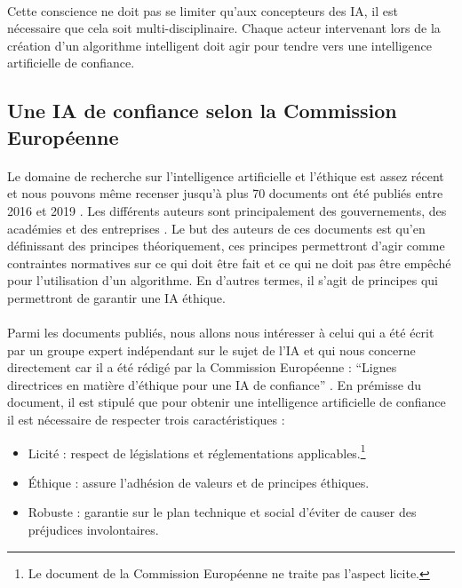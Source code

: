 \documentclass[10pt, french, a4paper]{report}
\begin{document}
\paragraph{}
Cette conscience ne doit pas se limiter qu’aux concepteurs des IA, il est nécessaire que cela soit multi-disciplinaire. Chaque acteur intervenant lors de la création d'un algorithme intelligent doit agir pour tendre vers une intelligence artificielle de confiance.

\subsection{Une IA de confiance selon la Commission Européenne}
\label{subsec:ia_confiance_com_ue}

\paragraph{}
Le domaine de recherche sur l'intelligence artificielle et l'éthique est assez récent et nous pouvons même recenser jusqu'à plus 70 documents ont été publiés entre 2016 et 2019 \citep{algorithm_watch_ai_2020}. Les différents auteurs sont principalement des gouvernements, des académies et des entreprises \citep{morley_what_2019}. Le but des auteurs de ces documents est qu'en définissant des principes théoriquement, ces principes permettront d'agir comme contraintes normatives \citep{turilli_ethical_2007} sur ce qui doit être fait et ce qui ne doit pas être empêché pour l'utilisation d'un algorithme. En d'autres termes, il s'agit de principes qui permettront de garantir une IA éthique.

\paragraph{}
Parmi les documents publiés, nous allons nous intéresser à celui qui a été écrit par un groupe expert indépendant sur le sujet de l'IA et qui nous concerne directement car il a été rédigé par la Commission Européenne : ``Lignes directrices en matière d'éthique pour une IA de confiance'' \citep{commission_europeenne_ethics_2019}. En prémisse du document, il est stipulé que pour obtenir une intelligence artificielle de confiance il est nécessaire de respecter trois caractéristiques : 

\begin{itemize}
  \item Licité : respect de législations et réglementations applicables.\footnote{Le document de la Commission Européenne ne traite pas l'aspect licite.}
  \item \uppercase{é}thique : assure l'adhésion de valeurs et de principes éthiques.
  \item Robuste : garantie sur le plan technique et social d'éviter de causer des préjudices involontaires.
\end{itemize}
\end{document}
